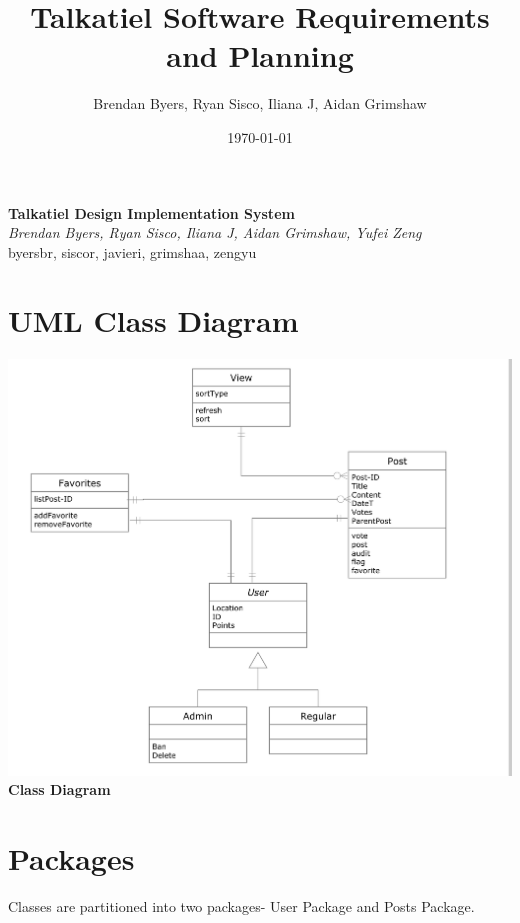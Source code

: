 \documentclass[12pt]{article}
\title{Talkatiel Software Requirements and Planning}
\author{Brendan Byers, Ryan Sisco, Iliana J, Aidan Grimshaw}
\date{\today}
\begin{document}
\begin{center}
      \Large\textbf{Talkatiel Design Implementation System}\\
      \large\textit{Brendan Byers, Ryan Sisco, Iliana J, Aidan Grimshaw, Yufei Zeng}\\
      \large{byersbr, siscor, javieri, grimshaa, zengyu}\\
   \end{center}

\tableofcontents

\section{UML Class Diagram}
\begin{center}
\includegraphics[scale=0.25]{img/uml/ClassDiagram}\linebreak
\textbf{Class Diagram}
  \end{center}

\section{Packages}

Classes are partitioned into two packages- User Package and Posts Package.
\end{document}
